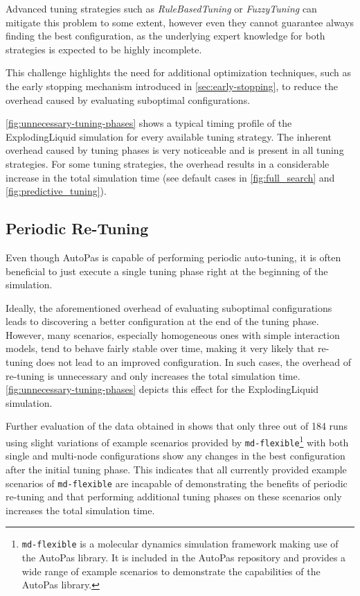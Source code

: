 \documentclass[conference]{IEEEtran}
\begin{document}
Advanced tuning strategies such as \textit{RuleBasedTuning} or \textit{FuzzyTuning} can mitigate this problem to some extent, however even they cannot guarantee always finding the best configuration, as the underlying expert knowledge for both strategies is expected to be highly incomplete.

This challenge highlights the need for additional optimization techniques, such as the early stopping mechanism introduced in \autoref{sec:early-stopping}, to reduce the overhead caused by evaluating suboptimal configurations.

\autoref{fig:unnecessary-tuning-phases} shows a typical timing profile of the ExplodingLiquid simulation for every available tuning strategy. The inherent overhead caused by tuning phases is very noticeable and is present in all tuning strategies. For some tuning strategies, the overhead results in a considerable increase in the total simulation time (see default cases in \autoref{fig:full_search} and \autoref{fig:predictive_tuning}).

\subsection*{Periodic Re-Tuning}

Even though AutoPas is capable of performing periodic auto-tuning, it is often beneficial to just execute a single tuning phase right at the beginning of the simulation.

Ideally, the aforementioned overhead of evaluating suboptimal configurations leads to discovering a better configuration at the end of the tuning phase. However, many scenarios, especially homogeneous ones with simple interaction models, tend to behave fairly stable over time, making it very likely that re-tuning does not lead to an improved configuration. In such cases, the overhead of re-tuning is unnecessary and only increases the total simulation time. \autoref{fig:unnecessary-tuning-phases} depicts this effect for the ExplodingLiquid simulation.

Further evaluation of the data obtained in \cite{lerchner2024} shows that only three out of 184 runs using slight variations of example scenarios provided by \texttt{md-flexible}\footnote{
    \texttt{md-flexible} is a molecular dynamics simulation framework making use of the AutoPas library. It is included in the AutoPas repository and provides a wide range of example scenarios to demonstrate the capabilities of the AutoPas library.
} with both single and multi-node configurations show any changes in the best configuration after the initial tuning phase. This indicates that all currently provided example scenarios of \texttt{md-flexible} are incapable of demonstrating the benefits of periodic re-tuning and that performing additional tuning phases on these scenarios only increases the total simulation time.
\end{document}

